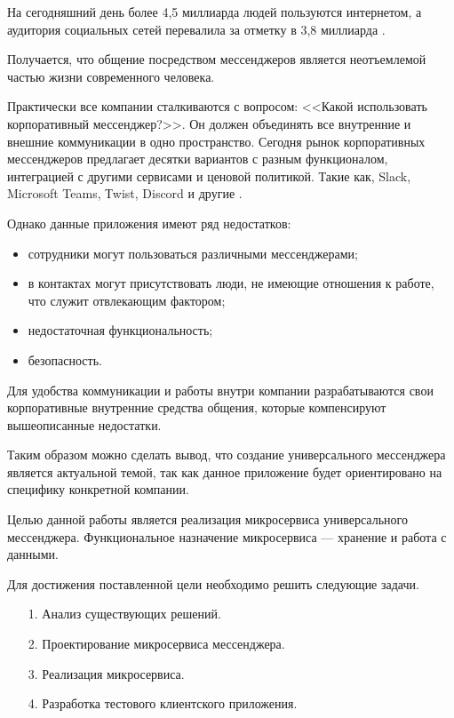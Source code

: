 \Introduction

\hfill

	На сегодняшний день более 4,5 миллиарда людей пользуются интернетом, а аудитория социальных сетей перевалила за отметку в 3,8 миллиарда \cite{useinternet}.
	
	Получается, что общение посредством мессенджеров является неотъемлемой частью жизни современного человека. 
	
	Практически все компании сталкиваются с вопросом: <<Какой использовать корпоративный мессенджер?>>. Он должен объединять все внутренние и внешние коммуникации в одно пространство. Сегодня рынок корпоративных мессенджеров предлагает десятки вариантов с разным функционалом, интеграцией с другими сервисами и ценовой политикой. Такие как, Slack, Microsoft Teams, Тwist, Discord и другие \cite{corporatemessengers}. 
	
	Однако данные приложения имеют ряд недостатков:
	\begin{itemize}
	\item сотрудники могут пользоваться различными мессенджерами;
	\item в контактах могут присутствовать люди, не имеющие отношения к работе, что служит отвлекающим фактором;
	\item недостаточная функциональность;
	\item безопасность. 
	\end{itemize}
	
	Для удобства коммуникации и работы внутри компании разрабатываются свои корпоративные внутренние средства общения, которые компенсируют вышеописанные недостатки. 
		
	Таким образом можно сделать вывод, что создание универсального мессенджера является актуальной темой, так как данное приложение будет ориентировано на специфику конкретной компании.
	
	Целью данной работы является реализация микросервиса универсального мессенджера.  Функциональное назначение микросервиса --- хранение и работа с данными.
	
	Для достижения поставленной цели необходимо решить следующие задачи. 
	\begin{enumerate}
		\item[1. ] Анализ существующих решений. 
		\item[2. ] Проектирование микросервиса мессенджера. 
		\item[3. ] Реализация микросервиса. 
		\item[4. ] Разработка тестового клиентского приложения. 
	\end{enumerate}



